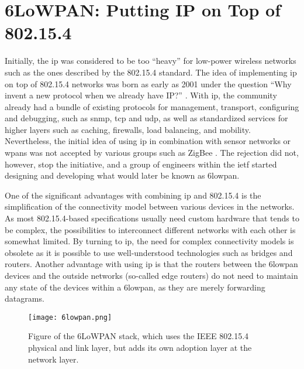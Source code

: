 \section{6LoWPAN: Putting IP on Top of 802.15.4}
\label{sec:6lowpan}


Initially, the \gls{ip} was considered to be too ``heavy'' for low-power wireless networks such as the ones described by the 802.15.4 standard. The idea of implementing \gls{ip} on top of 802.15.4 networks was born as early as 2001 under the question ``Why invent a new protocol when we already have IP?'' \cite{Mulligan2007}. With \gls{ip}, the community already had a bundle of existing protocols for management, transport, configuring and debugging, such as \gls{snmp}, \gls{tcp} and \gls{udp}, as well as standardized services for higher layers such as caching, firewalls, load balancing, and mobility. Nevertheless, the initial idea of using \gls{ip} in combination with sensor networks or \gls{wpan}s was not accepted by various groups such as ZigBee \cite{Mulligan2007}. The rejection did not, however, stop the initiative, and a group of engineers within the \gls{ietf} started designing and developing what would later be known as \gls{6lowpan}.

One of the significant advantages with combining \gls{ip} and 802.15.4 is the simplification of the connectivity model between various devices in the networks. As most 802.15.4-based specifications usually need custom hardware that tends to be complex, the possibilities to interconnect different networks with each other is somewhat limited. By turning to \gls{ip}, the need for complex connectivity models is obsolete as it is possible to use well-understood technologies such as bridges and routers. Another advantage with using \gls{ip} is that the routers between the \gls{6lowpan} devices and the outside networks (so-called edge routers) do not need to maintain any state of the devices within a \gls{6lowpan}, as they are merely forwarding datagrams.

\begin{figure}[h]
	\centering
	\texttt{[image: 6lowpan.png]}
	\caption{Figure of the 6LoWPAN stack, which uses the IEEE 802.15.4 physical and link layer, but adds its own adoption layer at the network layer.}
	\label{fig:6lowpan-stack}
\end{figure}

